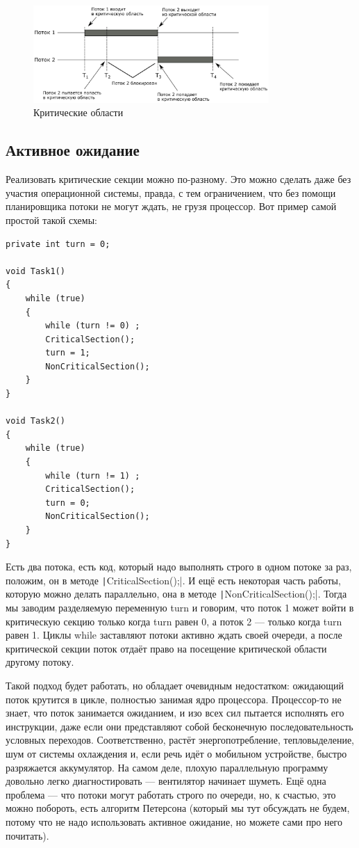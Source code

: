 \documentclass{../../text-style}
\begin{document}
\begin{figure}[ht]
    \centering
        \includegraphics[width=0.8\textwidth]{criticalSections.png}
    \caption{Критические области}
    \label{image:criticalSections}
\end{figure}

\subsection{Активное ожидание}

Реализовать критические секции можно по-разному. Это можно сделать даже без участия операционной системы, правда, с тем ограничением, что без помощи планировщика потоки не могут ждать, не грузя процессор. Вот пример самой простой такой схемы:

\begin{verbatim}
private int turn = 0;

void Task1()
{
    while (true)
    {
        while (turn != 0) ;
        CriticalSection();
        turn = 1;
        NonCriticalSection();
    }
}

void Task2()
{
    while (true)
    {
        while (turn != 1) ;
        CriticalSection();
        turn = 0;
        NonCriticalSection();
    }
}
\end{verbatim}

Есть два потока, есть код, который надо выполнять строго в одном потоке за раз, положим, он в методе \texttt|CriticalSection();|. И ещё есть некоторая часть работы, которую можно делать параллельно, она в методе \texttt|NonCriticalSection();|. Тогда мы заводим разделяемую переменную turn и говорим, что поток 1 может войти в критическую секцию только когда turn равен 0, а поток 2 --- только когда turn равен 1. Циклы while заставляют потоки активно ждать своей очереди, а после критической секции поток отдаёт право на посещение критической области другому потоку.

Такой подход будет работать, но обладает очевидным недостатком: ожидающий поток крутится в цикле, полностью занимая ядро процессора. Процессор-то не знает, что поток занимается ожиданием, и изо всех сил пытается исполнять его инструкции, даже если они представляют собой бесконечную последовательность условных переходов. Соответственно, растёт энергопотребление, тепловыделение, шум от системы охлаждения и, если речь идёт о мобильном устройстве, быстро разряжается аккумулятор. На самом деле, плохую параллельную программу довольно легко диагностировать --- вентилятор начинает шуметь. Ещё одна проблема --- что потоки могут работать строго по очереди, но, к счастью, это можно побороть, есть алгоритм Петерсона (который мы тут обсуждать не будем, потому что не надо использовать активное ожидание, но можете сами про него почитать).
\end{document}
